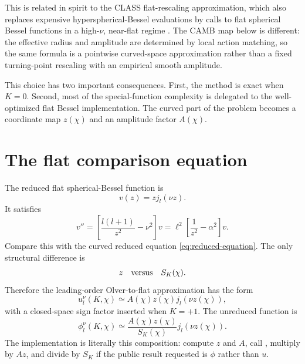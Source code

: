 \documentclass[11pt,a4paper]{article}
\newcommand{\code}[1]{\texttt{\detokenize{#1}}}
\newcommand{\SK}{S_K}
\begin{document}
This is related in spirit to the \textsc{CLASS} flat-rescaling approximation, which also replaces expensive hyperspherical-Bessel evaluations by calls to flat spherical Bessel functions in a high-\(\nu\), near-flat regime \cite{lesgourgues-tram2013}.  The CAMB map below is different: the effective radius and amplitude are determined by local action matching, so the same formula is a pointwise curved-space approximation rather than a fixed turning-point rescaling with an empirical smooth amplitude.

This choice has two important consequences.  First, the method is exact when \(K=0\).  Second, most of the special-function complexity is delegated to the well-optimized flat Bessel implementation.  The curved part of the problem becomes a coordinate map \(z(\chi)\) and an amplitude factor \(A(\chi)\).

\section{The flat comparison equation}

The reduced flat spherical-Bessel function is
\begin{equation}
  v(z)=zj_l(\nu z).
\end{equation}
It satisfies
\begin{equation}
  v''=\left[\frac{l(l+1)}{z^2}-\nu^2\right]v
  =\ell^2\left[\frac{1}{z^2}-\alpha^2\right]v.
  \label{eq:flat-comparison}
\end{equation}
Compare this with the curved reduced equation \eqref{eq:reduced-equation}.  The only structural difference is
\begin{equation}
  z \quad \hbox{versus} \quad \SK(\chi).
\end{equation}
Therefore the leading-order Olver-to-flat approximation has the form
\begin{equation}
  u_l^\nu(K,\chi)\simeq A(\chi)z(\chi)j_l(\nu z(\chi)),
  \label{eq:basic-olver-u}
\end{equation}
with a closed-space sign factor inserted when \(K=+1\).  The unreduced function is
\begin{equation}
  \phi_l^\nu(K,\chi)\simeq \frac{A(\chi)z(\chi)}{\SK(\chi)}j_l(\nu z(\chi)).
  \label{eq:basic-olver-phi}
\end{equation}
The implementation is literally this composition: compute \(z\) and \(A\), call \code{BJL(l,nu*z,j_l)}, multiply by \(A z\), and divide by \(\SK\) if the public result requested is \(\phi\) rather than \(u\).
\end{document}
